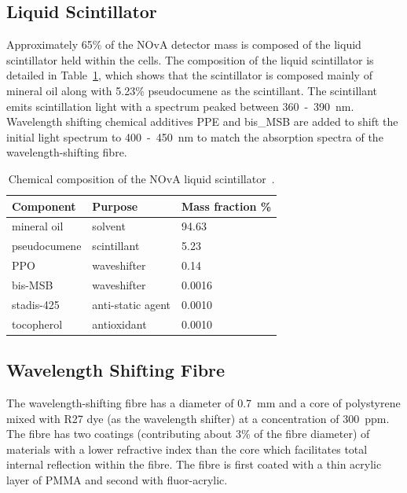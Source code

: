 \subsection{Liquid Scintillator}

Approximately 65\% of the NOvA detector mass is composed of the liquid
scintillator held within the cells. The composition of the liquid
scintillator is detailed in Table~\ref{tab:scintComp}, which shows that
the scintillator is composed mainly of mineral oil along with 5.23\%
pseudocumene as the scintillant. The scintillant emits scintillation
light with a spectrum peaked between 360~-~390~nm. Wavelength shifting
chemical additives PPE and bis\_MSB are added to shift the initial
light spectrum to 400~-~450~nm to match the absorption spectra of the
wavelength-shifting fibre. 


\begin{table}
  \centering
  \begin{tabular}{ l | l | l }
    Component & Purpose & Mass fraction \% \\ \hline
    mineral oil & solvent & 94.63 \\
    pseudocumene & scintillant & 5.23 \\
    PPO & waveshifter & 0.14 \\
    bis-MSB & waveshifter & 0.0016 \\
    stadis-425 & anti-static agent & 0.0010 \\
    tocopherol & antioxidant & 0.0010 \\
  \end{tabular}
  \caption{Chemical composition of the NOvA liquid scintillator~\cite{scintillatorComp}. }
  \label{tab:scintComp}
\end{table}


\subsection{Wavelength Shifting Fibre}
The wavelength-shifting fibre has a diameter of 0.7~mm and a core of
polystyrene mixed with R27 dye (as the wavelength shifter) at a
concentration of 300~ppm. The fibre has two
coatings (contributing about 3\% of the fibre diameter) of materials
with a lower refractive index than the core
which facilitates total internal reflection within the fibre. The
fibre is first coated with a thin acrylic layer of PMMA and second
with fluor-acrylic. 

